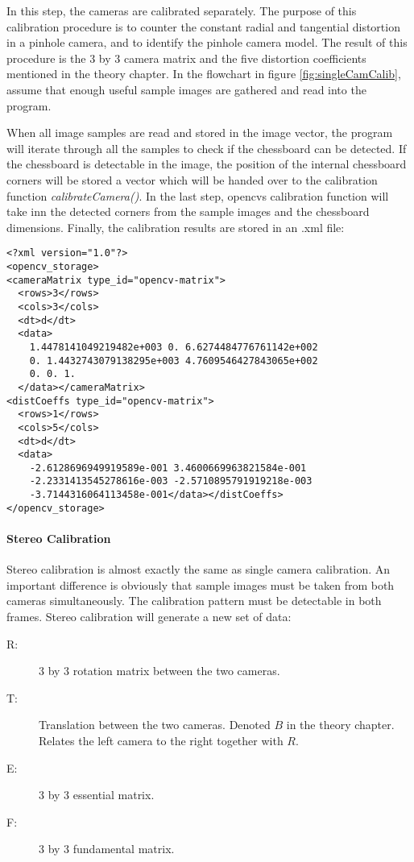 In this step, the cameras are calibrated separately.  The purpose of this calibration procedure is to counter the constant radial and tangential distortion in a pinhole camera, and to identify the pinhole camera model. The result of this procedure is the 3 by 3 camera matrix and the five distortion coefficients mentioned in the theory chapter. In the flowchart in figure \ref{fig:singleCamCalib}, assume that enough useful sample images are gathered and read into the program.

 When all image samples are read and stored in the image vector, the program will iterate through all the samples to check if the chessboard can be detected. If the chessboard is detectable in the image, the position of the internal chessboard corners will be stored a vector which will be handed over to the calibration function \textit{calibrateCamera()}. In the last step, \gls{opencv}s calibration function will take inn the detected corners from the sample images and the chessboard dimensions. Finally, the calibration results are stored in an .xml file:

\begin{verbatim}
<?xml version="1.0"?>
<opencv_storage>
<cameraMatrix type_id="opencv-matrix">
  <rows>3</rows>
  <cols>3</cols>
  <dt>d</dt>
  <data>
    1.4478141049219482e+003 0. 6.6274484776761142e+002 
    0. 1.4432743079138295e+003 4.7609546427843065e+002 
    0. 0. 1.
  </data></cameraMatrix>
<distCoeffs type_id="opencv-matrix">
  <rows>1</rows>
  <cols>5</cols>
  <dt>d</dt>
  <data>
    -2.6128696949919589e-001 3.4600669963821584e-001
    -2.2331413545278616e-003 -2.5710895791919218e-003
    -3.7144316064113458e-001</data></distCoeffs>
</opencv_storage>
\end{verbatim}

\newpage

\paragraph{Stereo Calibration}

Stereo calibration is almost exactly the same as single camera calibration. An important difference is obviously that sample images must be taken from both cameras simultaneously. The calibration pattern must be detectable in both frames. Stereo calibration will generate a new set of data:

\begin{description}
	\item[R: ] 3 by 3 rotation matrix between the two cameras.
	\item[T: ] Translation between the two cameras. Denoted $B$ in the theory chapter. Relates the left camera to the right together with $R$. 
	\item[E: ] 3 by 3 essential matrix.
	\item[F: ] 3 by 3 fundamental matrix.
\end{description}

